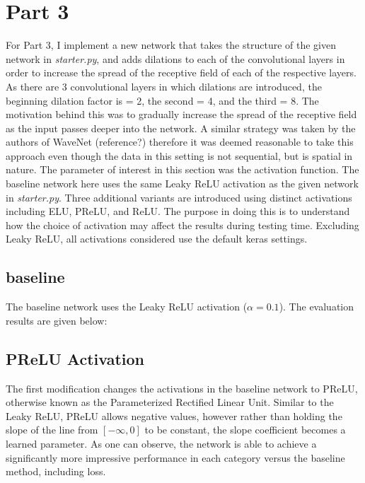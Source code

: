 \documentclass{article}
\begin{document}
\section*{Part 3}

For Part 3, I implement a new network that takes the structure of the given network in \emph{starter.py}, and adds dilations to each of the convolutional layers in order to increase the spread of the receptive field of each of the respective layers. As there are 3 convolutional layers in which dilations are introduced, the beginning dilation factor is = 2, the second = 4, and the third = 8. The motivation behind this was to gradually increase the spread of the receptive field as the input passes deeper into the network. A similar strategy was taken by the authors of WaveNet (reference?) therefore it was deemed reasonable to take this approach even though the data in this setting is not sequential, but is spatial in nature. The parameter of interest in this section was the activation function. The baseline network here uses the same Leaky ReLU activation as the given network in \emph{starter.py}. Three additional variants are introduced using distinct activations including ELU, PReLU, and ReLU. The purpose in doing this is to understand how the choice of activation may affect the results during testing time. Excluding Leaky ReLU, all activations considered use the default keras settings.

\subsection*{baseline}
The baseline network uses the Leaky ReLU activation ($\alpha = 0.1$). The evaluation results are given below:
		
		
\subsection*{PReLU Activation}
The first modification changes the activations in the baseline network to PReLU, otherwise known as the Parameterized Rectified Linear Unit. Similar to the Leaky ReLU, PReLU allows negative values, however rather than holding the slope of the line from $[-\infty,0]$ to be constant, the slope coefficient becomes a learned parameter. As one can observe, the network is able to achieve a significantly more impressive performance in each category versus the baseline method, including loss.
		
\end{document}
